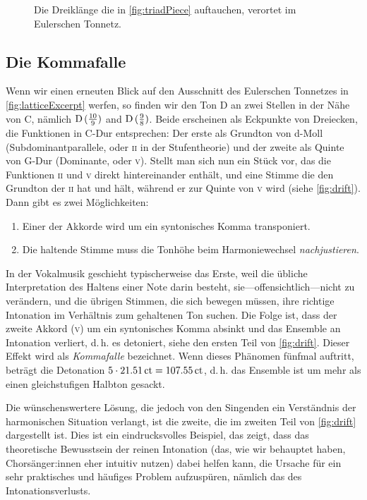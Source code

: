 \documentclass[ngerman,11pt]{scrartcl}
\begin{document}
\begin{figure}
  
  \caption{Die Dreiklänge die in \cref{fig:triadPiece} auftauchen, verortet im
  	Eulerschen Tonnetz.}\label{fig:chordsLattice}
\end{figure}

\subsection{Die Kommafalle}

Wenn wir einen erneuten Blick auf den Ausschnitt des Eulerschen Tonnetzes in
\cref{fig:latticeExcerpt} werfen, so finden wir den Ton D an zwei Stellen in der
Nähe von C, nämlich \naturalm $\text{D}\,(\frac{10}9)$ and $\text{D}\,(\frac98)$. Beide
erscheinen als Eckpunkte von Dreiecken, die Funktionen in C-Dur entsprechen: Der
erste als Grundton von d-Moll (Subdominantparallele, oder \textsc{ii} in der
Stufentheorie) und der zweite als Quinte von G-Dur (Dominante, oder \textsc{v}).
Stellt man sich nun ein Stück vor, das die Funktionen \textsc{ii} und \textsc{v}
direkt hintereinander enthält, und eine Stimme die den Grundton der \textsc{ii}
hat und hält, während er zur Quinte von \textsc{v} wird (siehe
\cref{fig:drift}). Dann gibt es zwei Möglichkeiten:


\begin{enumerate}[itemsep=0em]
\item Einer der Akkorde wird um ein syntonisches Komma transponiert.
\item Die haltende Stimme muss die Tonhöhe beim Harmoniewechsel 
  \emph{nachjustieren}.
\end{enumerate}%
%
In der Vokalmusik geschieht typischerweise das Erste, weil die übliche
Interpretation des Haltens einer Note darin besteht, sie—offensichtlich—nicht zu
verändern, und die übrigen Stimmen, die sich bewegen müssen, ihre richtige
Intonation im Verhältnis zum gehaltenen Ton suchen. Die Folge ist, dass der
zweite Akkord (\textsc{v}) um ein syntonisches Komma absinkt und das Ensemble
an Intonation verliert, d.\,h. es detoniert, siehe den ersten Teil von
\cref{fig:drift}. Dieser Effekt wird als \emph{Kommafalle} bezeichnet. Wenn
dieses Phänomen fünfmal auftritt, beträgt die Detonation
$5\cdot 21.51\,\mathrm{ct}=107.55\,\mathrm{ct}$, d.\,h. das Ensemble ist um mehr als
einen gleichstufigen Halbton gesackt.

Die wünschenswertere Lösung, die jedoch von den Singenden ein Verständnis der
harmonischen Situation verlangt, ist die zweite, die im zweiten Teil von
\cref{fig:drift} dargestellt ist. Dies ist ein eindrucksvolles Beispiel, das
zeigt, dass das theoretische Bewusstsein der reinen Intonation (das, wie wir
behauptet haben, Chorsänger:innen eher intuitiv nutzen) dabei helfen kann, die
Ursache für ein sehr praktisches und häufiges Problem aufzuspüren, nämlich das
des Intonationsverlusts.
\end{document}
